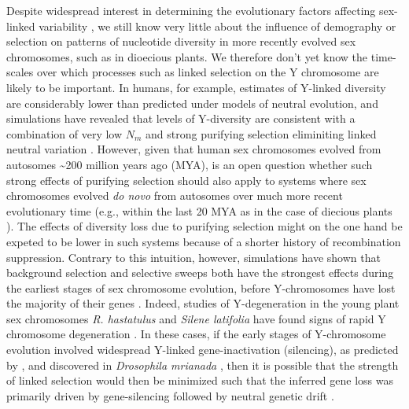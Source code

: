 \documentclass[9pt,twocolumn,twoside]{gsajnl}
\begin{document}
Despite widespread interest in determining the evolutionary factors affecting sex-linked variability \citep{ellegren2011,bachtrog2013NRG}, we still know very little about the influence of demography or selection on patterns of nucleotide diversity in more recently evolved sex chromosomes, such as in dioecious plants. We therefore don't yet know the time-scales over which processes such as linked selection on the Y chromosome are likely to be important. In humans, for example, estimates of Y-linked diversity are considerably lower than predicted under models of neutral evolution, and simulations have revealed that levels of Y-diversity are consistent with a combination of very low $N_{m}$ and strong purifying selection eliminiting linked neutral variation \citep{Wilsonsayres2014}. However, given that human sex chromosomes evolved from autosomes \textasciitilde 200 million years ago (MYA), is an open question whether such strong effects of purifying selection should also apply to systems where sex chromosomes evolved \textit{do novo} from autosomes over much more recent evolutionary time (e.g., within the last 20 MYA as in the case of diecious plants \citep{charlesworth2015plant}). The effects of diversity loss due to purifying selection might on the one hand be expeted to be lower in such systems because of a shorter history of recombination suppression. Contrary to this intuition, however, simulations have shown that background selection and selective sweeps both have the strongest effects during the earliest stages of sex chromosome evolution, before Y-chromosomes have lost the majority of their genes \citep{bachtrog2008temporal}. Indeed, studies of Y-degeneration in the young plant sex chromosomes \textit{R. hastatulus} and \textit{Silene latifolia} have found signs of rapid Y chromosome degeneration \citep{hough2014,papadopulos2015,charlesworth2016plant}. In these cases, if the early stages of Y-chromosome evolution involved widespread Y-linked gene-inactivation (silencing), as predicted by \citep{orr1998adaptive}, and discovered in \textit{Drosophila mrianada} \citep{zhou2012chromosome}, then it is possible that the strength of linked selection would then be minimized such that the inferred gene loss was primarily driven by gene-silencing followed by neutral genetic drift \citep{bachtrog2013NRG}.

\end{document}
